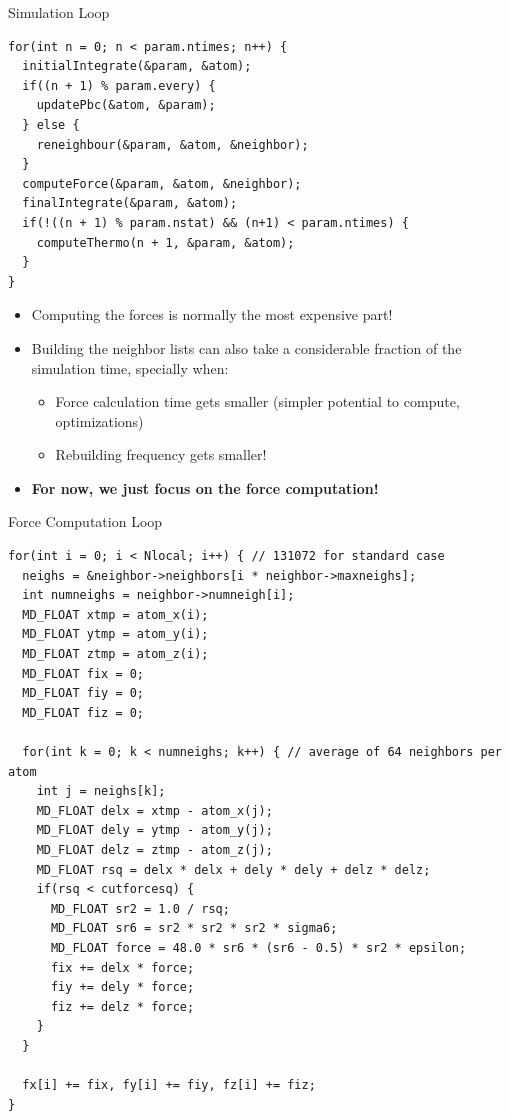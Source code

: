 \documentclass[aspectratio=169,t]{beamer}
\begin{document}
  \begin{frame}[fragile]{Simulation Loop}
    \begin{lstlisting}
for(int n = 0; n < param.ntimes; n++) {
  initialIntegrate(&param, &atom);
  if((n + 1) % param.every) {
    updatePbc(&atom, &param);
  } else {
    reneighbour(&param, &atom, &neighbor);
  }
  computeForce(&param, &atom, &neighbor);
  finalIntegrate(&param, &atom);
  if(!((n + 1) % param.nstat) && (n+1) < param.ntimes) {
    computeThermo(n + 1, &param, &atom);
  }
}
    \end{lstlisting}
    \begin{itemize}
      \item Computing the forces is normally the most expensive part!
      \item Building the neighbor lists can also take a considerable fraction of the simulation time, specially when:
      \begin{itemize}
        \item Force calculation time gets smaller (simpler potential to compute, optimizations)
        \item Rebuilding frequency gets smaller!
      \end{itemize}
      \item \textbf{For now, we just focus on the force computation!}
    \end{itemize}
  \end{frame}

  \begin{frame}[fragile]{Force Computation Loop}
    \vspace{-15.5pt}
    \begin{lstlisting}[basicstyle=\tt\tiny]
for(int i = 0; i < Nlocal; i++) { // 131072 for standard case
  neighs = &neighbor->neighbors[i * neighbor->maxneighs];
  int numneighs = neighbor->numneigh[i];
  MD_FLOAT xtmp = atom_x(i);
  MD_FLOAT ytmp = atom_y(i);
  MD_FLOAT ztmp = atom_z(i);
  MD_FLOAT fix = 0;
  MD_FLOAT fiy = 0;
  MD_FLOAT fiz = 0;

  for(int k = 0; k < numneighs; k++) { // average of 64 neighbors per atom
    int j = neighs[k];
    MD_FLOAT delx = xtmp - atom_x(j);
    MD_FLOAT dely = ytmp - atom_y(j);
    MD_FLOAT delz = ztmp - atom_z(j);
    MD_FLOAT rsq = delx * delx + dely * dely + delz * delz;
    if(rsq < cutforcesq) {
      MD_FLOAT sr2 = 1.0 / rsq;
      MD_FLOAT sr6 = sr2 * sr2 * sr2 * sigma6;
      MD_FLOAT force = 48.0 * sr6 * (sr6 - 0.5) * sr2 * epsilon;
      fix += delx * force;
      fiy += dely * force;
      fiz += delz * force;
    }
  }

  fx[i] += fix, fy[i] += fiy, fz[i] += fiz;
}
    \end{lstlisting}
  \end{frame}
\end{document}
